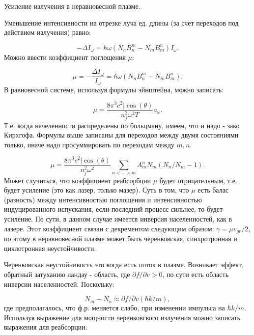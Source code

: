 \documentclass[10pt, a4paper]{article}
\begin{document}
Усиление излучения в неравновесной плазме.

Уменьшение интенсивности на отрезке луча ед. длины (за счет переходов под действием излучения) равно:

\begin{equation}
    -\Delta I_\omega=\hbar\omega (N_n B_n^m - N_m B_m^n) I_\omega.
\end{equation}
Можно ввести коэффициент поглощения $\mu$:

\begin{equation}
    \mu=-\frac{\Delta I_\omega}{I_\omega}=\hbar\omega (N_n B_n^m - N_m B_m^n).
\end{equation}
В равновесной системе, используя формулы эйнштейна, можно записать:

\begin{equation}
    \mu=\frac{8\pi^3 c^2|\cos(\theta)}{n_j^2 \omega^2 T}a_\omega.
\end{equation}
Т.е. когда начеленности распределены по больцману, имеем, что и надо - зако Кирхгофа. Формулы выше записаны для переходов
между двумя состояниями только, иначе надо просуммировать по переходам между $m, n$.

\begin{equation}
    \mu=\frac{8\pi^3 c^2|\cos(\theta)}{n_j^2 \omega^2}\sum_{n<->m} A^n_m N_m (N_n/N_m - 1).
\end{equation}
Может случиться, что коэффициент реабсорбции $\mu$ будет отрицательным, т.е. будет усиление (это как лазер, только мазер).
Суть в том, что $\mu$ есть балас (разность) между интенсивностью поглощения и интенсивностью индуцированного испускания,
если последний процесс сильнее, то будет усиление. По сути, в данном случае имеется инверсия населенностей, как в
лазере. 
Этот коэффициент связан с декрементом следующим образом: $\gamma = \mu v_{gr}/2$, по этому в неравновесной плазме
может быть черенковская, синхротронная и циклотронная неустойчивости.

Черенковская неустойнивость это когда есть поток в плазме. Возникает эффект, обратный затуханию ландау - область, где
$\partial f/\partial v > 0$, по сути есть область инверсии населенностей. Поскольку: 

\begin{equation}
    N_m - N_n\approx \partial f/\partial v (\hbar k/m),
\end{equation}
где предполагалось, что ф.р. меняется слабо, при изменении импульса на $\hbar k/m$. Используя выражение для мощности
черенковского излучения можно записать выражения для реабсорции:
\end{document}
